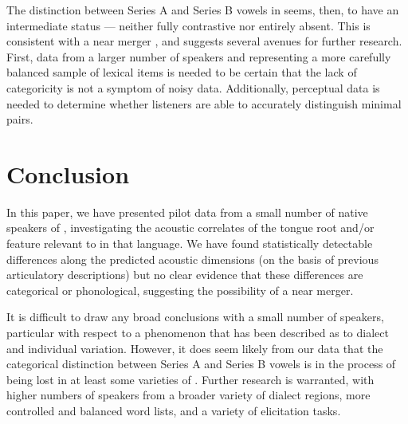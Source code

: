 \documentclass[output=paper
,newtxmath
,modfonts
,nonflat]{langsci/langscibook}
\begin{document}
The distinction between Series A and Series B vowels in  seems, then, to have an intermediate status --- neither fully contrastive nor entirely absent.  This is consistent with a near merger \citep{Labovetal1972}, and suggests several avenues for further research.  First, data from a larger number of speakers and representing a more carefully balanced sample of lexical items is needed to be certain that the lack of categoricity is not a symptom of noisy data.  Additionally, perceptual data is needed to determine whether listeners are able to accurately distinguish minimal pairs.  

\section{Conclusion}

In this paper, we have presented pilot data from a small number of native speakers of , investigating the acoustic correlates of the tongue root and/or  feature relevant to  in that language.  We have found statistically detectable differences along the predicted acoustic dimensions (on the basis of previous articulatory descriptions) but no clear evidence that these differences are categorical or phonological, suggesting the possibility of a near merger.

It is difficult to draw any broad conclusions with a small number of speakers, particular with respect to a phenomenon that has been described as  to dialect and individual variation.  However, it does seem likely from our data that the categorical distinction between Series A and Series B vowels is in the process of being lost in at least some varieties of .  Further research is warranted, with higher numbers of speakers from a broader variety of dialect regions, more controlled and balanced word lists, and a variety of elicitation tasks.

{\sloppy
\printbibliography[heading=subbibliography,notkeyword=this]}
\end{document}
